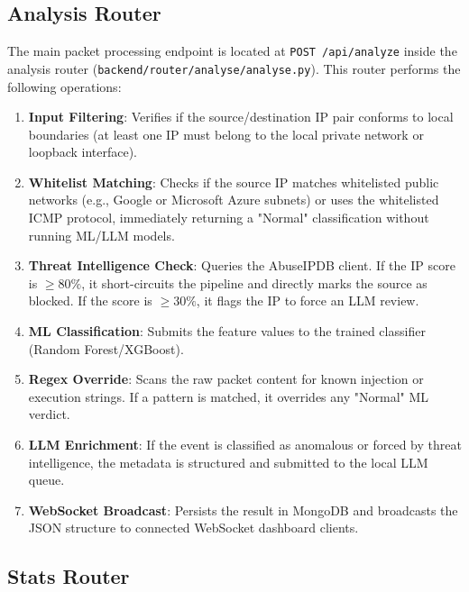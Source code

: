 \documentclass[12pt,a4paper]{report}
\begin{document}
\subsection{Analysis Router}

The main packet processing endpoint is located at \texttt{POST /api/analyze} inside the analysis router (\texttt{backend/router/analyse/analyse.py}). This router performs the following operations:
\begin{enumerate}[leftmargin=1.5em]
  \item \textbf{Input Filtering}: Verifies if the source/destination IP pair conforms to local boundaries (at least one IP must belong to the local private network or loopback interface).
  \item \textbf{Whitelist Matching}: Checks if the source IP matches whitelisted public networks (e.g., Google or Microsoft Azure subnets) or uses the whitelisted ICMP protocol, immediately returning a "Normal" classification without running ML/LLM models.
  \item \textbf{Threat Intelligence Check}: Queries the AbuseIPDB client. If the IP score is $\ge 80\%$, it short-circuits the pipeline and directly marks the source as blocked. If the score is $\ge 30\%$, it flags the IP to force an LLM review.
  \item \textbf{ML Classification}: Submits the feature values to the trained classifier (Random Forest/XGBoost).
  \item \textbf{Regex Override}: Scans the raw packet content for known injection or execution strings. If a pattern is matched, it overrides any "Normal" ML verdict.
  \item \textbf{LLM Enrichment}: If the event is classified as anomalous or forced by threat intelligence, the metadata is structured and submitted to the local LLM queue.
  \item \textbf{WebSocket Broadcast}: Persists the result in MongoDB and broadcasts the JSON structure to connected WebSocket dashboard clients.
\end{enumerate}

\subsection{Stats Router}
\end{document}
